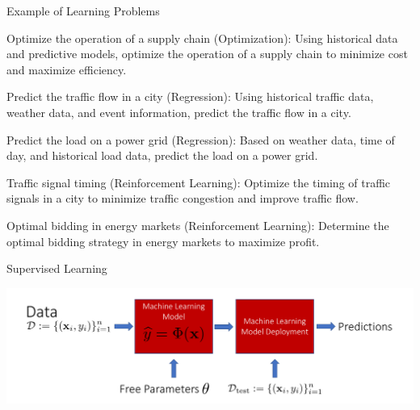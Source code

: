 \documentclass[aspectratio=169,xcolor=dvipsnames,svgnames,x11names,fleqn]{beamer}
\begin{document}
\begin{frame}{Example of Learning Problems}
\begin{itemize}
      { \item  Optimize the operation of a supply chain (Optimization): Using historical data and predictive models, optimize the operation of a supply chain to minimize cost and maximize efficiency.}
     { \item Predict the traffic flow in a city (Regression): Using historical traffic data, weather data, and event information, predict the traffic flow in a city.}
    {  \item Predict the load on a power grid (Regression): Based on weather data, time of day, and historical load data, predict the load on a power grid.}
     { \item Traffic signal timing (Reinforcement Learning): Optimize the timing of traffic signals in a city to minimize traffic congestion and improve traffic flow.}
   {   \item Optimal bidding in energy markets (Reinforcement Learning): Determine the optimal bidding strategy in energy markets to maximize profit.}

    
\end{itemize}

\end{frame}

 \begin{frame}{Supervised Learning}

 \begin{center}
     \includegraphics[height=.5\textheight]{figures/ml.pdf}
 \end{center}

 \end{frame}
\end{document}
